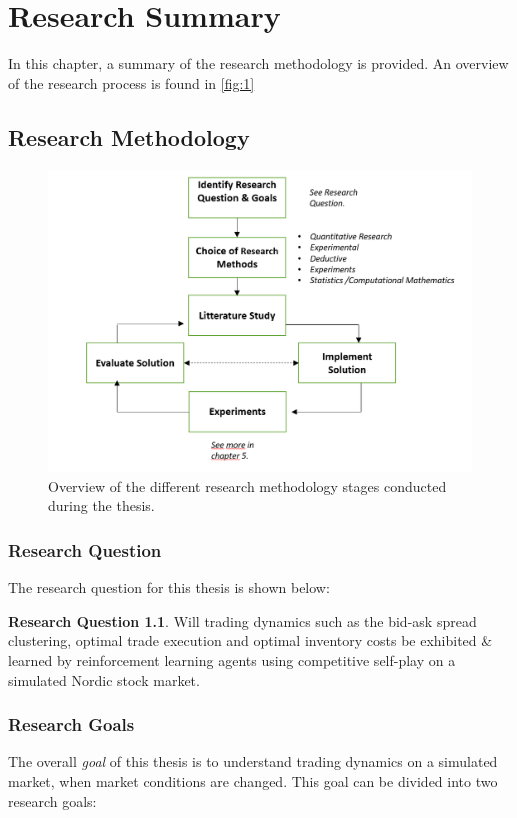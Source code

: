 \documentclass{kththesis}
\theoremstyle{definition}
\newtheorem{RQ}{Research Question}[section]
\begin{document}
\chapter{Research Summary}\label{ch:4}
In this chapter, a summary of the research methodology is provided. An overview of the research process is found in \autoref{fig:1}

\section{Research Methodology}
\begin{figure}[H]
    \centering
    \includegraphics[scale=.9]{Imgs/researchmethodsv2.PNG}
    \caption{Overview of the different research methodology stages conducted during the thesis.}
    \label{fig:r1}
\end{figure}

\subsection{Research Question}
The research question for this thesis is shown below:

\begin{RQ}
Will trading dynamics such as the bid-ask spread clustering, optimal trade execution and optimal inventory costs be exhibited \& learned by reinforcement learning agents using competitive self-play on a simulated Nordic stock market.
\end{RQ}

\subsection{Research Goals}
The overall \textit{goal} of this thesis is to understand trading dynamics on a simulated market, when market conditions are changed. This goal can be divided into two research goals:
\end{document}
